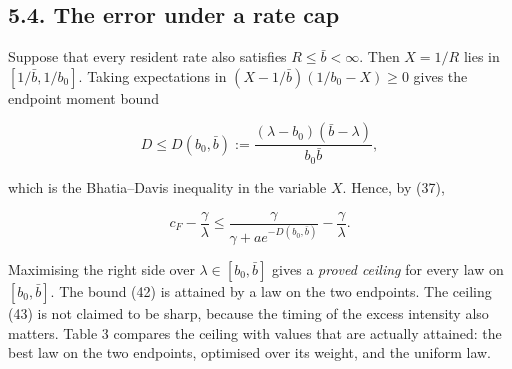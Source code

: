 \documentclass[
  british,
  11pt,
  a4paper,
]{article}
\begin{document}
\subsection{5.4. The error under a rate
cap}\label{the-error-under-a-rate-cap}

Suppose that every resident rate also satisfies \(R\le\bar b<\infty\).
Then \(X=1/R\) lies in \([1/\bar b,1/b_0]\). Taking expectations in
\((X-1/\bar b)(1/b_0-X)\ge0\) gives the endpoint moment bound

\[
D\le D(b_0,\bar b):=\frac{(\lambda-b_0)(\bar b-\lambda)}{b_0\bar b},
\tag{42}
\]

which is the Bhatia--Davis inequality in the variable \(X\). Hence, by
(37),

\[
c_F-\frac\gamma\lambda\le\frac\gamma{\gamma+ae^{-D(b_0,\bar b)}}-\frac\gamma\lambda.
\tag{43}
\]

Maximising the right side over \(\lambda\in[b_0,\bar b]\) gives a
\emph{proved ceiling} for every law on \([b_0,\bar b]\). The bound (42)
is attained by a law on the two endpoints. The ceiling (43) is not
claimed to be sharp, because the timing of the excess intensity also
matters. Table 3 compares the ceiling with values that are actually
attained: the best law on the two endpoints, optimised over its weight,
and the uniform law.
\end{document}
